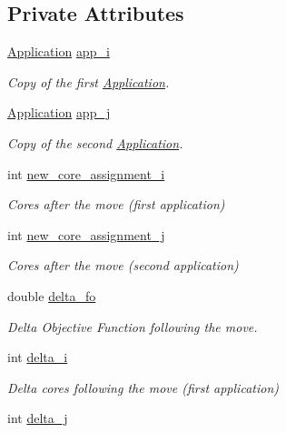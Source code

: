\subsection*{Private Attributes}
\begin{DoxyCompactItemize}
\item 
\hyperlink{classApplication}{Application} \hyperlink{classCandidate__pair_acc570b14122b1f3cbc0e5440778cd4d8}{app\-\_\-i}
\begin{DoxyCompactList}\small\item\em Copy of the first \hyperlink{classApplication}{Application}. \end{DoxyCompactList}\item 
\hyperlink{classApplication}{Application} \hyperlink{classCandidate__pair_a7497fbea2f53cb71a01486e2b655880e}{app\-\_\-j}
\begin{DoxyCompactList}\small\item\em Copy of the second \hyperlink{classApplication}{Application}. \end{DoxyCompactList}\item 
int \hyperlink{classCandidate__pair_a8ede26b1a4d583b2b9ac360612c789bf}{new\-\_\-core\-\_\-assignment\-\_\-i}
\begin{DoxyCompactList}\small\item\em Cores after the move (first application) \end{DoxyCompactList}\item 
int \hyperlink{classCandidate__pair_ab4d273d1e72ae26d5230f4d783ef745b}{new\-\_\-core\-\_\-assignment\-\_\-j}
\begin{DoxyCompactList}\small\item\em Cores after the move (second application) \end{DoxyCompactList}\item 
double \hyperlink{classCandidate__pair_a190b95c0ee800a6b37fec8f5d84c62c6}{delta\-\_\-fo}
\begin{DoxyCompactList}\small\item\em Delta Objective Function following the move. \end{DoxyCompactList}\item 
int \hyperlink{classCandidate__pair_af9ed12a88dc27e921764feea5d1369f1}{delta\-\_\-i}
\begin{DoxyCompactList}\small\item\em Delta cores following the move (first application) \end{DoxyCompactList}\item 
int \hyperlink{classCandidate__pair_a65cec47eee407768393199d82f1eebe4}{delta\-\_\-j}

\end{DoxyCompactItemize}
